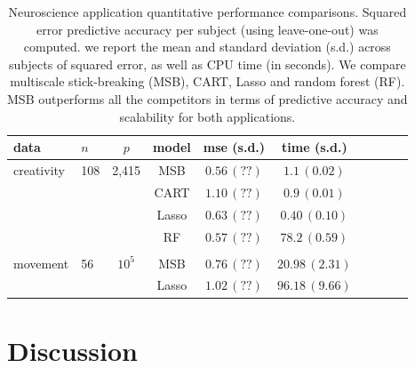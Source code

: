 \begin{table}[t]
\caption{Neuroscience application quantitative performance comparisons. Squared error predictive accuracy per subject (using leave-one-out) was computed. we report the mean and standard deviation (s.d.) across subjects of squared error, as well as CPU time (in seconds).
We compare multiscale stick-breaking (MSB), CART, Lasso and random forest (RF). MSB outperforms all the competitors in terms of predictive accuracy and scalability for both applications.}\label{real}
\vskip 0.15in
\begin{center}
\begin{small}
\begin{sc}
\begin{tabular}{llcccccccc}
\hline
data &$n$&$p$ &model&mse (s.d.) & time (s.d.) \\ %
\hline
creativity & 108 & 2,415 & MSB &$0.56 \, (??)$ &  $1.1 \, (0.02)$\\
 &&& CART & $1.10 \, (??) $ &  $0.9 \, (0.01)$\\
&&& Lasso & $0.63 \, (??)$  &  $0.40 \, (0.10)$\\
&&& RF & $0.57 \, (??)$ &   $78.2 \, (0.59)$\\
\\
 movement & 56 & $10^5$& MSB &$0.76 \, (??)$  & $20.98 \, (2.31)$\\
 &&& Lasso & $1.02 \, (??)$ & $96.18 \, (9.66)$\\
\hline
\end{tabular}
\end{sc}
\end{small}
\end{center}
\vspace{-10pt}
\end{table}

\section{Discussion} \label{sec:discussion}



 
 



